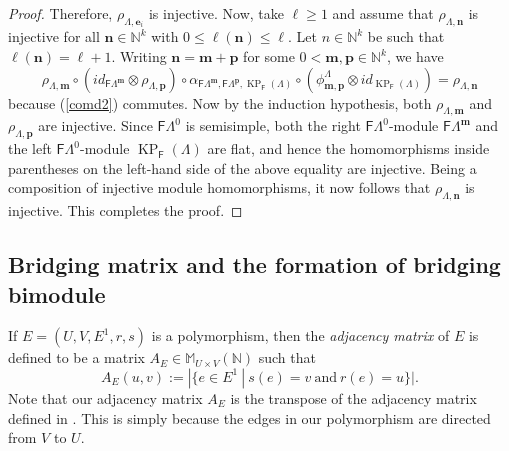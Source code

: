 \documentclass[12pt]{amsart}
\newcommand{\N}{\mathbf{n}}
\newcommand{\M}{\mathbf{m}}
\newcommand{\KP}{\operatorname{KP}}
\theoremstyle{definition}
\theoremstyle{remark}
\begin{document}
\begin{proof}
Therefore, $\rho_{\Lambda,\mathbf{e}_i}$ is injective. Now, take $\ell\ge 1$ and assume that $\rho_{\Lambda,\N}$ is injective for all $\N\in \mathbb{N}^k$ with $0\le \ell(\N)\le \ell$. Let $n\in \mathbb{N}^k$ be such that $\ell(\N)=\ell+1$. Writing $\N=\M+\mathbf{p}$ for some $0<\M,\mathbf{p}\in \mathbb{N}^k$, we have \[\rho_{\Lambda,\M}\circ (id_{\mathsf{F}\Lambda^\M}\otimes \rho_{\Lambda,\mathbf{p}})\circ \alpha_{\mathsf{F}\Lambda^\M,\mathsf{F}\Lambda^\mathbf{p},\KP_\mathsf{F}(\Lambda)}\circ (\phi_{\M,\mathbf{p}}^\Lambda\otimes id_{\KP_\mathsf{F}(\Lambda)})=\rho_{\Lambda,\N}\] because (\ref{comd2}) commutes. Now by the induction hypothesis, both $\rho_{\Lambda,\M}$ and $\rho_{\Lambda,\mathbf{p}}$ are injective. Since $\mathsf{F}\Lambda^0$ is semisimple, both the right $\mathsf{F}\Lambda^0$-module $\mathsf{F}\Lambda^{\mathbf{m}}$ and the left $\mathsf{F}\Lambda^0$-module $\KP_\mathsf{F}(\Lambda)$ are flat, and hence the homomorphisms inside parentheses on the left-hand side of the above equality are injective. Being a composition of injective module homomorphisms, it now follows that $\rho_{\Lambda,\N}$ is injective. This completes the proof.
\end{proof}

\subsection{Bridging matrix and the formation of bridging bimodule}\label{ssec bridging matrix}
If $E=(U,V,E^1,r,s)$ is a polymorphism, then the \emph{adjacency matrix} of $E$ is defined to be a matrix $A_E\in \mathbb{M}_{U\times V}(\mathbb{N})$ such that \[A_E(u,v):=|\{e\in E^1~|~s(e)=v~\text{and}~r(e)=u\}|.\] Note that our adjacency matrix $A_E$ is the transpose of the adjacency matrix defined in \cite[Definition 3.2]{ART}. This is simply because the edges in our polymorphism are directed from $V$ to $U$. 
\end{document}
